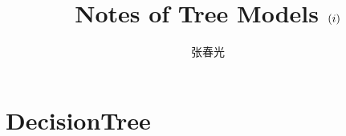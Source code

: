 \documentclass[a4paper]{article}
\title{Notes of Tree Models $\left(\uppercase\expandafter{\romannumeral1}\right)$}
\author{张春光}
\begin{document}
\par\setlength\parindent{1cm}
\maketitle{}
\section{DecisionTree}
\end{document}
